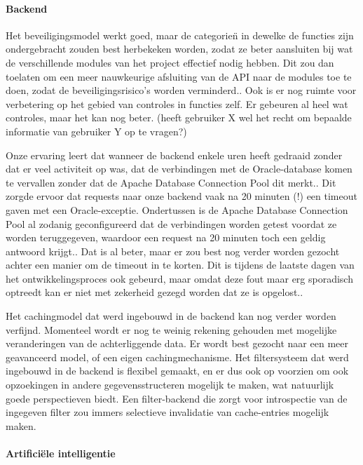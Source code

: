 \paragraph{Backend} Het beveiligingsmodel werkt goed, maar de categorie\"n in dewelke de functies zijn ondergebracht zouden best herbekeken worden, zodat ze beter aansluiten bij wat de verschillende modules van het project effectief nodig hebben. Dit zou dan toelaten om een meer nauwkeurige afsluiting van de API naar de modules toe te doen, zodat de beveiligingsrisico's worden verminderd.. Ook is er nog ruimte voor verbetering op het gebied van controles in functies zelf. Er gebeuren al heel wat controles, maar het kan nog beter. (heeft gebruiker X wel het recht om bepaalde informatie van gebruiker Y op te vragen?)

Onze ervaring leert dat wanneer de backend enkele uren heeft gedraaid zonder dat er veel activiteit op was, dat de verbindingen met de Oracle-database komen te vervallen zonder dat de Apache Database Connection Pool dit merkt.. Dit zorgde ervoor dat requests naar onze backend vaak na 20 minuten (!) een timeout gaven met een Oracle-exceptie. Ondertussen is de Apache Database Connection Pool al zodanig geconfigureerd dat de verbindingen worden getest voordat ze worden teruggegeven, waardoor een request na 20 minuten toch een geldig antwoord krijgt.. Dat is al beter, maar er zou best nog verder worden gezocht achter een manier om de timeout in te korten. Dit is tijdens de laatste dagen van het ontwikkelingsproces ook gebeurd, maar omdat deze fout maar erg sporadisch optreedt kan er niet met zekerheid gezegd worden dat ze is opgelost..

Het cachingmodel dat werd ingebouwd in de backend kan nog verder worden verfijnd. Momenteel wordt er nog te weinig rekening gehouden met mogelijke veranderingen van de achterliggende data. Er wordt best gezocht naar een meer geavanceerd model, of een eigen cachingmechanisme. Het filtersysteem dat werd ingebouwd in de backend is flexibel gemaakt, en er dus ook op voorzien om ook opzoekingen in andere gegevensstructeren mogelijk te maken, wat natuurlijk goede perspectieven biedt. Een filter-backend die zorgt voor introspectie van de ingegeven filter zou immers selectieve invalidatie van cache-entries mogelijk maken.

\paragraph{Artifici\"ele intelligentie}

